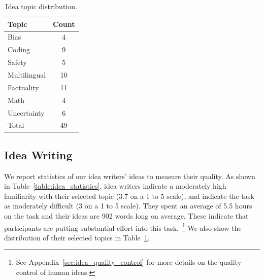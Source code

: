 \begin{table} %
\centering
\small
\begin{tabular}{l c} 
 \hline
 Topic & Count \\ 
 \hline
 Bias & 4 \\
 Coding & 9 \\
 Safety & 5 \\
 Multilingual & 10 \\
 Factuality & 11 \\
 Math & 4 \\
 Uncertainty & 6 \\
 \hline 
 Total & 49 \\
 \hline
\end{tabular}
\caption{Idea topic distribution.}
\label{table:topic_distribution}
\vspace{-0.2cm}
\end{table}



\subsection{Idea Writing}


We report statistics of our idea writers' ideas to measure their quality. 
As shown in Table~\ref{table:idea_statistics}, idea writers indicate a moderately high familiarity with their selected topic (3.7 on a 1 to 5 scale), and indicate the task as moderately difficult (3 on a 1 to 5 scale). They spent an average of 5.5 hours on the task and their ideas are 902 words long on average. These indicate that participants are putting substantial effort into this task.~\footnote{See Appendix~\ref{sec:idea_quality_control} for more details on the quality control of human ideas.} 
We also show the distribution of their selected topics in Table~\ref{table:topic_distribution}. 





